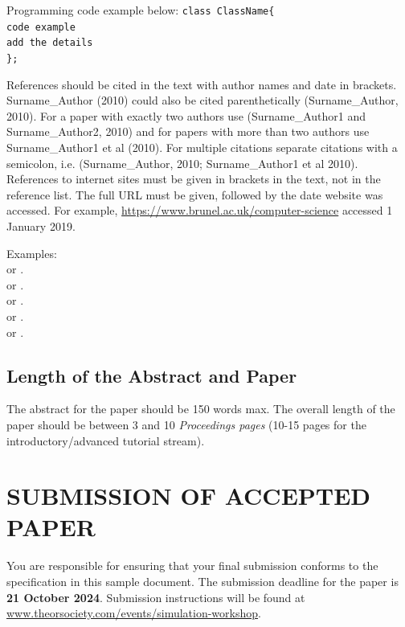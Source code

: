 \documentclass{swpaperproc}
\theoremstyle{sw}
\begin{document}
Programming code example below:\newline
\newline
{\tt class ClassName\{}\\
{\tt code example}\\
{\tt add the details}\\
{\tt \};}


References should be cited in the text with author names and date in brackets. 
Surname\_Author (2010) could also be cited parenthetically (Surname\_Author, 2010). For a paper with exactly two authors use (Surname\_Author1 and Surname\_Author2, 2010) and for papers with more than two authors use Surname\_Author1 et al (2010). For multiple citations separate citations with a semicolon, i.e. (Surname\_Author, 2010; Surname\_Author1 et al 2010). References to internet sites must be given in brackets in the text, not in the reference list. The full URL must be given, followed by the date website was accessed. For example, \href{https://www.brunel.ac.uk/computer-science}{https://www.brunel.ac.uk/computer-science} accessed 1 January 2019.

Examples: \\
 or \cite{chen10}.\\
 or \cite{glover97}.\\
 or \cite{mourtos03}.\\
 or \cite{osman95}.\\
 or \cite{ryan06}.


\subsection{Length of the Abstract and Paper}
The abstract for the paper should be 150 words max. The overall length of the paper should be between 3 and 10 {\em Proceedings pages} (10-15 pages for the introductory/advanced tutorial stream).

\section{SUBMISSION OF ACCEPTED PAPER}

You are responsible for ensuring that your final submission conforms to the specification in this
sample document. The submission deadline for the paper is {\bf 21 October 2024}. Submission
instructions will be found at \href{https://www.theorsociety.com/ORS/Events/2025/Simulation-Workshop/SW25-Main.aspx?EventKey=SW25&WebsiteKey=c1745213-aec0-45e5-a960-0ec98ebabd4e}{www.theorsociety.com/events/simulation-workshop}.
\end{document}
